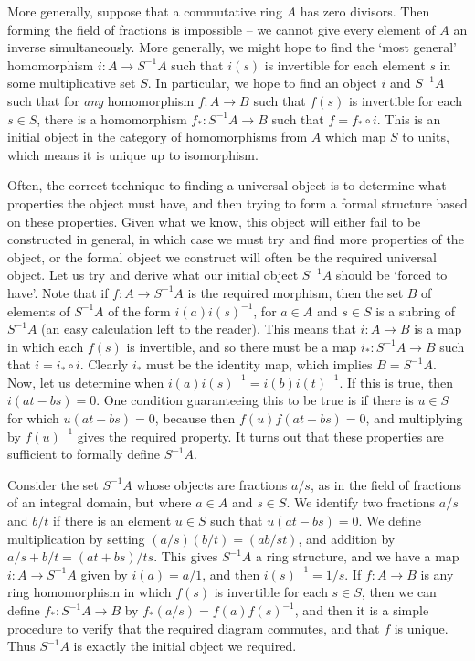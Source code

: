 More generally, suppose that a commutative ring $A$ has zero divisors. Then forming the field of fractions is impossible -- we cannot give every element of $A$ an inverse simultaneously. More generally, we might hope to find the `most general' homomorphism $i: A \to S^{-1}A$ such that $i(s)$ is invertible for each element $s$ in some multiplicative set $S$. In particular, we hope to find an object $i$ and $S^{-1}A$ such that for {\it any} homomorphism $f: A \to B$ such that $f(s)$ is invertible for each $s \in S$, there is a homomorphism $f_*: S^{-1}A \to B$ such that $f = f_* \circ i$. This is an initial object in the category of homomorphisms from $A$ which map $S$ to units, which means it is unique up to isomorphism.

Often, the correct technique to finding a universal object is to determine what properties the object must have, and then trying to form a formal structure based on these properties. Given what we know, this object will either fail to be constructed in general, in which case we must try and find more properties of the object, or the formal object we construct will often be the required universal object. Let us try and derive what our initial object $S^{-1}A$ should be `forced to have'. Note that if $f: A \to S^{-1}A$ is the required morphism, then the set $B$ of elements of $S^{-1}A$ of the form $i(a)i(s)^{-1}$, for $a \in A$ and $s \in S$ is a subring of $S^{-1}A$ (an easy calculation left to the reader). This means that $i: A \to B$ is a map in which each $f(s)$ is invertible, and so there must be a map $i_*: S^{-1}A \to B$ such that $i = i_* \circ i$. Clearly $i_*$ must be the identity map, which implies $B = S^{-1}A$. Now, let us determine when $i(a)i(s)^{-1} = i(b)i(t)^{-1}$. If this is true, then $i(at - bs) = 0$. One condition guaranteeing this to be true is if there is $u \in S$ for which $u(at - bs) = 0$, because then $f(u)f(at-bs) = 0$, and multiplying by $f(u)^{-1}$ gives the required property. It turns out that these properties are sufficient to formally define $S^{-1}A$.

Consider the set $S^{-1}A$ whose objects are fractions $a/s$, as in the field of fractions of an integral domain, but where $a \in A$ and $s \in S$. We identify two fractions $a/s$ and $b/t$ if there is an element $u \in S$ such that $u(at - bs) = 0$. We define multiplication by setting $(a/s)(b/t) = (ab/st)$, and addition by $a/s + b/t = (at + bs)/ts$. This gives $S^{-1}A$ a ring structure, and we have a map $i: A \to S^{-1}A$ given by $i(a) = a/1$, and then $i(s)^{-1} = 1/s$. If $f: A \to B$ is any ring homomorphism in which $f(s)$ is invertible for each $s \in S$, then we can define $f_*: S^{-1}A \to B$ by $f_*(a/s) = f(a)f(s)^{-1}$, and then it is a simple procedure to verify that the required diagram commutes, and that $f$ is unique. Thus $S^{-1}A$ is exactly the initial object we required.

